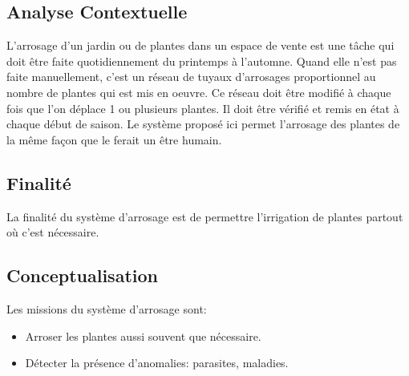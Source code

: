 \textcolor[RGB]{46, 116, 181}{\chapter{Analyse Contextuelle}}
L'arrosage d'un jardin ou de plantes dans un espace de vente est une tâche qui doit être faite quotidiennement du printemps à l'automne.
Quand elle n'est pas faite manuellement, c'est un réseau de tuyaux d'arrosages proportionnel au nombre de plantes qui est mis en oeuvre.
Ce réseau doit être modifié à chaque fois que l'on déplace 1 ou plusieurs plantes. Il doit être vérifié et remis en état à chaque début de saison.
Le système proposé ici permet l'arrosage des plantes de la même façon que le ferait un être humain.

\section{Finalité}
La finalité du système d'arrosage est de permettre l'irrigation de plantes partout où c'est nécessaire.

\section{Conceptualisation}
Les missions du système d'arrosage sont:
\begin{itemize}
\item Arroser les plantes aussi souvent que nécessaire.
\item Détecter la présence d'anomalies: parasites, maladies.
\end{itemize}
